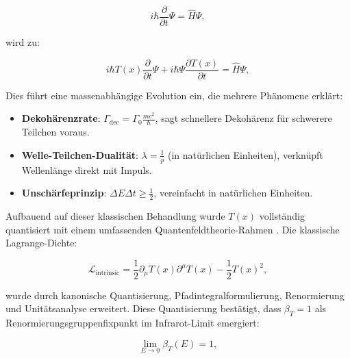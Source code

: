 \documentclass[twocolumn,aps,prl]{revtex4-2}
\begin{document}
{{{{{{{{{{{{{{																\begin{equation}
																	i \hbar \frac{\partial}{\partial t} \Psi = \hat{H} \Psi, \label{eq:std_schrodinger}
																\end{equation}
																
																wird zu:
																
																\begin{equation}
																	i \hbar T(x) \frac{\partial}{\partial t} \Psi + i \hbar \Psi \frac{\partial T(x)}{\partial t} = \hat{H} \Psi, \label{eq:mod_schrodinger}
																\end{equation}
																
																Dies führt eine massenabhängige Evolution ein, die mehrere Phänomene erklärt:
																
																\begin{itemize}
																	\item \textbf{Dekohärenzrate}: \(\Gamma_{\text{dec}} = \Gamma_0 \frac{m c^2}{\hbar}\), sagt schnellere Dekohärenz für schwerere Teilchen voraus.
																	\item \textbf{Welle-Teilchen-Dualität}: \(\lambda = \frac{1}{p}\) (in natürlichen Einheiten), verknüpft Wellenlänge direkt mit Impuls.
																	\item \textbf{Unschärfeprinzip}: \(\Delta E \Delta t \geq \frac{1}{2}\), vereinfacht in natürlichen Einheiten.
																\end{itemize}
																
																Aufbauend auf dieser klassischen Behandlung wurde \(T(x)\) vollständig quantisiert mit einem umfassenden Quantenfeldtheorie-Rahmen \cite{pascher_qft_2025}. Die klassische Lagrange-Dichte:
																
																\begin{equation}
																	\mathcal{L}_{\text{intrinsic}} = \frac{1}{2} \partial_{\mu} T(x) \partial^{\mu} T(x) - \frac{1}{2} T(x)^2, \label{eq:lagrangian_T}
																\end{equation}
																
																wurde durch kanonische Quantisierung, Pfadintegralformulierung, Renormierung und Unitätsanalyse erweitert. Diese Quantisierung bestätigt, dass \(\beta_T = 1\) als Renormierungsgruppenfixpunkt im Infrarot-Limit emergiert:
																
																\begin{equation}
																	\lim_{E \to 0} \beta_T(E) = 1, \label{eq:beta_fixed_point}
																\end{equation}
																
}}}}}}}}}}}}}}
\end{document}
